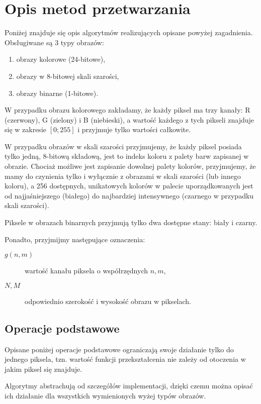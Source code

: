 \documentclass{classrep}
\begin{document}
\section{Opis metod przetwarzania}

Poniżej znajduje się opis algorytmów realizujących opisane powyżej zagadnienia. Obsługiwane są 3 typy obrazów:
\begin{enumerate}
 \item obrazy kolorowe (24-bitowe),
 \item obrazy w 8-bitowej skali szarości,
 \item obrazy binarne (1-bitowe).
\end{enumerate}

W przypadku obrazu kolorowego zakładamy, że każdy piksel ma trzy kanały: R (czerwony), G (zielony) i B (niebieski), a wartość każdego z tych pikseli znajduje się w zakresie $[0; 255]$ i przyjmuje tylko wartości całkowite.

W przypadku obrazów w skali szarości przyjmujemy, że każdy piksel posiada tylko jedną, 8-bitową składową, jest to indeks koloru z palety barw zapisanej w obrazie. Chociaż możliwe jest zapisanie dowolnej palety kolorów, przyjmujemy, że mamy do czynienia tylko i wyłącznie z obrazami w skali szarości (lub innego koloru), a 256 dostępnych, unikatowych kolorów w palecie uporządkowanych jest od najjaśniejszego (białego) do najbardziej intensywnego (czarnego \ppauza w przypadku skali szarości).

Piksele w obrazach binarnych przyjmują tylko dwa dostępne stany: biały i czarny.

Ponadto, przyjmijmy następujące oznaczenia:
\begin{description}
 \item[$g(n, m)$] wartość kanału piksela o współrzędnych $n, m$,
 \item[$N, M$] odpowiednio szerokość i wysokość obrazu w pikselach.
\end{description}


\subsection{Operacje podstawowe}

Opisane poniżej operacje podstawowe ograniczają swoje działanie tylko do jednego piksela, tzn. wartość funkcji przekształcenia nie zależy od otoczenia w jakim piksel się znajduje.

Algorytmy abstrachują od szczegółów implementacji, dzięki czemu można opisać ich działanie dla wszystkich wymienionych wyżej typów obrazów.
\end{document}
